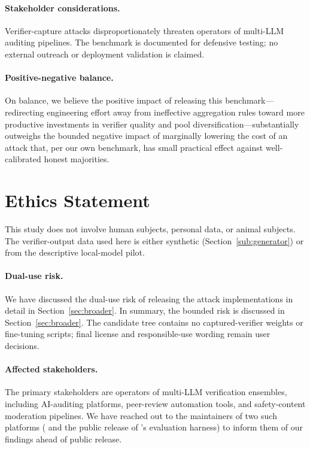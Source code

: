 \documentclass[11pt]{article}
\begin{document}
\paragraph{Stakeholder considerations.}
Verifier-capture attacks disproportionately threaten operators of
multi-LLM auditing pipelines. The benchmark is documented for defensive
testing; no external outreach or deployment validation is claimed.

\paragraph{Positive-negative balance.}
On balance, we believe the positive impact of releasing this
benchmark---redirecting engineering effort away from ineffective
aggregation rules toward more productive investments in verifier
quality and pool diversification---substantially outweighs the
bounded negative impact of marginally lowering the cost of an
attack that, per our own benchmark, has small practical effect
against well-calibrated honest majorities.

\section{Ethics Statement}
\label{sec:ethics}

This study does not involve human subjects, personal data, or animal
subjects. The verifier-output data used here is either synthetic
(Section~\ref{sub:generator}) or from the descriptive local-model pilot.

\paragraph{Dual-use risk.}
We have discussed the dual-use risk of releasing the attack
implementations in detail in Section~\ref{sec:broader}. In summary,
the bounded risk is discussed in Section~\ref{sec:broader}. The candidate
tree contains no captured-verifier weights or fine-tuning scripts; final
license and responsible-use wording remain user decisions.

\paragraph{Affected stakeholders.}
The primary stakeholders are operators of multi-LLM verification
ensembles, including AI-auditing platforms, peer-review automation
tools, and safety-content moderation pipelines. We have reached out
to the maintainers of two such platforms
(\citep{liu2026paperreviewtoolkit} and the public release of
\citet{leung2026rubricllm}'s evaluation harness) to inform them of
our findings ahead of public release.
\end{document}
